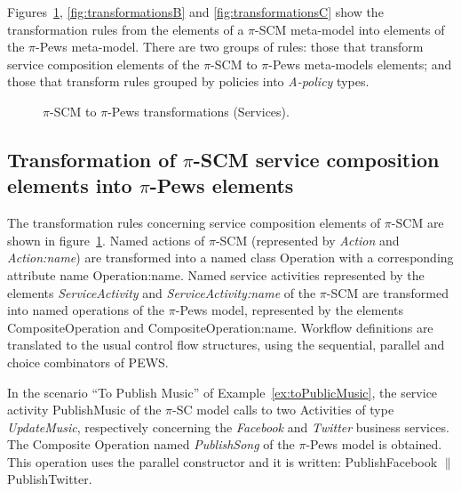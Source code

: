 
Figures~\ref{fig:transformationsA}, \ref{fig:transformationsB} and \ref{fig:transformationsC} show the transformation rules from the elements of a $\pi$-SCM meta-model into elements of the $\pi$-{\sc Pews} meta-model. 
There are two groups of rules: those that transform service composition elements of the $\pi$-SCM to $\pi$-{\sc Pews} meta-models elements; and those that transform rules grouped by policies into {\em A-policy} types.
\begin{figure}
\caption{ $\pi$-SCM to $\pi$-{\sc Pews} transformations (Services).}
\label{fig:transformationsA}
\end{figure}


\subsection{Transformation of $\pi$-SCM service composition elements into $\pi$-{\sc Pews} elements}

The transformation rules concerning service composition elements of $\pi$-SCM are shown in figure~\ref{fig:transformationsA}.
Named actions of $\pi$-SCM (represented by {\sc\em Action} and {\sc\em Action:name}) are transformed into a named class {\sc Operation} with a corresponding attribute name {\sc Operation:name}. 
Named service activities represented by the elements {\sc\em ServiceActivity}  and  {\sc\em ServiceActivity:name} of the $\pi$-SCM are transformed into named operations of the $\pi$-{\sc Pews} model, represented by the elements {\sc CompositeOperation} and {\sc CompositeOperation:name}. 
Workflow definitions are translated to the usual control flow structures, using the sequential, parallel and choice combinators of PEWS.

\begin{example}
In the scenario ``To Publish Music'' of Example~\ref{ex:toPublicMusic}, the service activity {\sf PublishMusic} of the $\pi$-SC model calls to two {\sf Activities} of type {\em UpdateMusic}, respectively concerning the {\em Facebook} and {\em Twitter} business services. 
The {\sf Composite Operation} named {\em PublishSong} of the $\pi$-{\sc Pews} model is obtained.
This operation uses the parallel constructor and it is written: {\sf PublishFacebook} $\parallel$ {\sf PublishTwitter}.
\end{example}



